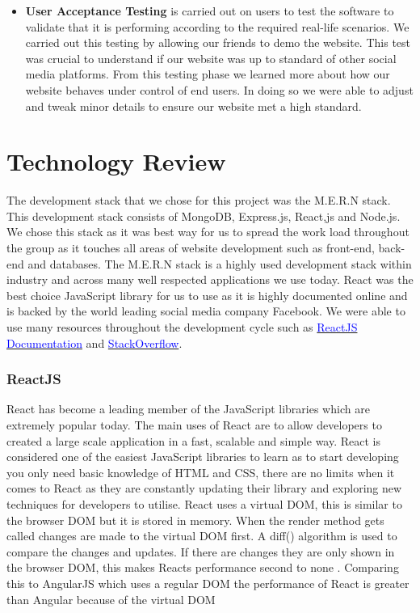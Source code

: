 \begin{itemize}
\item \textbf{User Acceptance Testing}
 is carried out on users to test the software to validate that it is performing according to the required real-life scenarios.\newline
 We carried out this testing by allowing our friends to demo the website. This test was crucial to understand if our website was up to standard of other social media platforms. From this testing phase we learned more about how our website behaves under control of end users. In doing so we were able to adjust and tweak minor details to ensure our website met a high standard.

\end{itemize}


\chapter{Technology Review}

The development stack that we chose for this project was the M.E.R.N stack. This development stack consists of MongoDB, Express.js, React,js and Node.js. We chose this stack as it was best way for us to spread the work load throughout the group as it touches all areas of website development such as front-end, back-end and databases. The M.E.R.N stack is a highly used development stack within industry and across many well respected applications we use today. React was the best choice JavaScript library for us to use as it is highly documented online and is backed by the world leading social media company Facebook. We were able to use many resources throughout the development cycle such as \href{https://reactjs.org/}{\textcolor{blue}{ReactJS Documentation}} and \href{https://stackoverflow.com/}{\textcolor{blue}{StackOverflow}}.
\newline

\subsection{ReactJS}
React has become a leading member of the JavaScript libraries which are extremely popular today. The main uses of React are to allow developers to created a large scale application in a fast, scalable and simple way. React is considered one of the easiest JavaScript libraries to learn as to start developing you only need basic knowledge of HTML and CSS, there are no limits when it comes to React as they are constantly updating their library and exploring new techniques for developers to utilise. 
React uses a virtual DOM, this is similar to the browser DOM but it is stored in memory. When the render method gets called changes are made to the virtual DOM first. A diff() algorithm is used to compare the changes and updates. If there are changes they are only shown in the browser DOM, this makes Reacts performance second to none \cite{aggarwal2018modern}. Comparing this to AngularJS which uses a regular DOM the performance of React is greater than Angular because of the virtual DOM \cite{kumar2016comparative}
\newline

